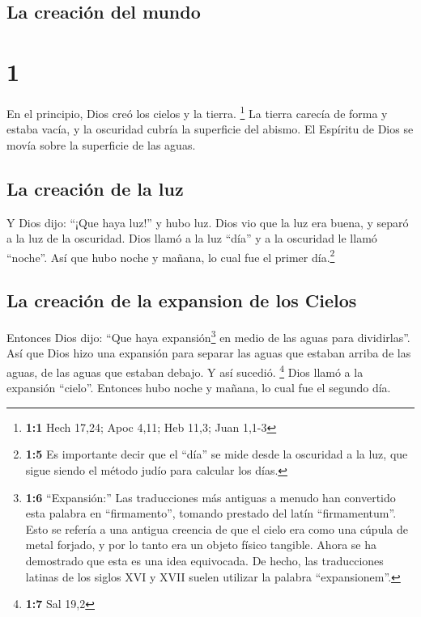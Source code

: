 \hypertarget{la-creaciuxf3n-del-mundo}{%
\subsection{La creación del mundo}\label{la-creaciuxf3n-del-mundo}}

\hypertarget{section}{%
\section{1}\label{section}}

 En el principio, Dios creó los cielos y la tierra.
\footnote{\textbf{1:1} Hech 17,24; Apoc 4,11; Heb 11,3; Juan 1,1-3}
 La tierra carecía de forma y estaba vacía, y la oscuridad
cubría la superficie del abismo. El Espíritu de Dios se movía sobre la
superficie de las aguas.

\hypertarget{la-creaciuxf3n-de-la-luz}{%
\subsection{La creación de la luz}\label{la-creaciuxf3n-de-la-luz}}

 Y Dios dijo: ``¡Que haya luz!'' y hubo luz.
 Dios vio que la luz era buena, y separó a la luz de la
oscuridad.  Dios llamó a la luz ``día'' y a la oscuridad
le llamó ``noche''. Así que hubo noche y mañana, lo cual fue el primer
día.\footnote{\textbf{1:5} Es importante decir que el ``día'' se mide
  desde la oscuridad a la luz, que sigue siendo el método judío para
  calcular los días.}

\hypertarget{la-creaciuxf3n-de-la-expansion-de-los-cielos}{%
\subsection{La creación de la expansion de los
Cielos}\label{la-creaciuxf3n-de-la-expansion-de-los-cielos}}

 Entonces Dios dijo: ``Que haya expansión\footnote{\textbf{1:6}
  ``Expansión:'' Las traducciones más antiguas a menudo han convertido
  esta palabra en ``firmamento'', tomando prestado del latín
  ``firmamentum''. Esto se refería a una antigua creencia de que el
  cielo era como una cúpula de metal forjado, y por lo tanto era un
  objeto físico tangible. Ahora se ha demostrado que esta es una idea
  equivocada. De hecho, las traducciones latinas de los siglos XVI y
  XVII suelen utilizar la palabra ``expansionem''.} en medio de las
aguas para dividirlas''.  Así que Dios hizo una expansión
para separar las aguas que estaban arriba de las aguas, de las aguas que
estaban debajo. Y así sucedió. \footnote{\textbf{1:7} Sal 19,2}
 Dios llamó a la expansión ``cielo''. Entonces hubo noche
y mañana, lo cual fue el segundo día.

